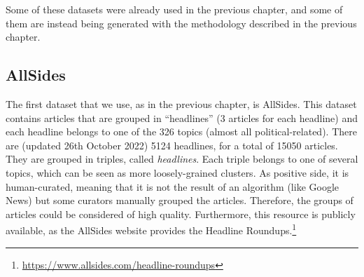 Some of these datasets were already used in the previous chapter, and some of them are instead being generated with the methodology described in the previous chapter.



\subsection{AllSides}

The first dataset that we use, as in the previous chapter, is AllSides.
This dataset contains articles that are grouped in “headlines” (3 articles for each headline) and each headline belongs to one of the 326 topics (almost all political-related). There are (updated 26th October 2022) 5124 headlines, for a total of 15050 articles. They are grouped in triples, called \emph{headlines}. Each triple belongs to one of several topics, which can be seen as more loosely-grained clusters. 
As positive side, it is human-curated,
meaning that it is not the result of an algorithm (like Google News) but some curators manually grouped the articles. Therefore, the groups of articles could be considered of high quality.
Furthermore, this resource is publicly available, as the AllSides website provides the Headline Roundups.\footnote{\url{https://www.allsides.com/headline-roundups}}

